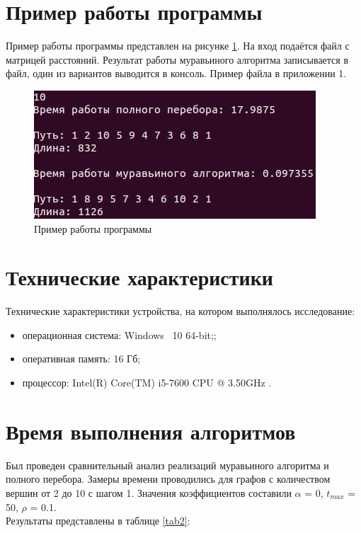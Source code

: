 \documentclass[12pt]{report}
\begin{document}
	\section{Пример работы программы}
	Пример работы программы представлен на рисунке \ref{fig:ex}. На вход подаётся файл с матрицей расстояний. Результат работы муравьиного алгоритма записывается в файл, один из вариантов выводится в консоль. Пример файла в приложении 1.
	\captionsetup{singlelinecheck=true}
	\begin{figure}[H]
		\centering
		\includegraphics[width=1\linewidth]{img/ex}
		\caption{Пример работы программы}
		\label{fig:ex}
	\end{figure}
	
	\section{Технические характеристики}
	Технические характеристики устройства, на котором выполнялось исследование:
	\begin{itemize}
		\item операционная система: Windows~\cite{windows} 10 64-bit;;
		\item оперативная память: 16 Гб;
		\item процессор: Intel(R) Core(TM) i5-7600 CPU @ 3.50GHz \cite{i5}.
	\end{itemize}
	
	\section{Время выполнения алгоритмов}
	Был проведен сравнительный анализ реализаций муравьиного алгоритма и полного перебора. Замеры времени проводились для графов с количеством вершин от 2 до 10 с шагом 1. Значения коэффициентов составили $\alpha$ = 0, $t_{max}$ = 50, $\rho$ = 0.1.\\
	Результаты представлены в таблице \ref{tab2}:\\
	
\end{document}
